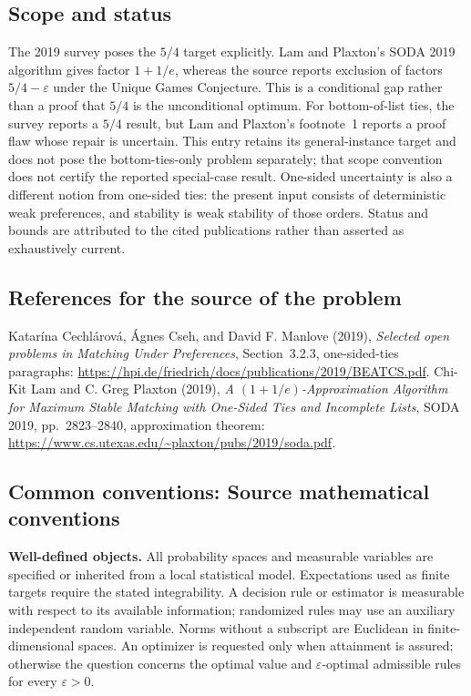 \documentclass[11pt,a4paper]{article}
\begin{document}
\subsection*{Scope and status}
The 2019 survey poses the $5/4$ target explicitly. Lam and Plaxton's SODA 2019 algorithm gives factor $1+1/e$, whereas the source reports exclusion of factors $5/4-\varepsilon$ under the Unique Games Conjecture. This is a conditional gap rather than a proof that $5/4$ is the unconditional optimum. For bottom-of-list ties, the survey reports a $5/4$ result, but Lam and Plaxton's footnote~1 reports a proof flaw whose repair is uncertain. This entry retains its general-instance target and does not pose the bottom-ties-only problem separately; that scope convention does not certify the reported special-case result. One-sided uncertainty is also a different notion from one-sided ties: the present input consists of deterministic weak preferences, and stability is weak stability of those orders. Status and bounds are attributed to the cited publications rather than asserted as exhaustively current.
\subsection*{References for the source of the problem}
Katar\'ina Cechl\'arov\'a, \'Agnes Cseh, and David F. Manlove (2019), \emph{Selected open problems in Matching Under Preferences}, Section~3.2.3, one-sided-ties paragraphs: \url{https://hpi.de/friedrich/docs/publications/2019/BEATCS.pdf}. Chi-Kit Lam and C. Greg Plaxton (2019), \emph{A $(1+1/e)$-Approximation Algorithm for Maximum Stable Matching with One-Sided Ties and Incomplete Lists}, SODA 2019, pp.~2823--2840, approximation theorem: \url{https://www.cs.utexas.edu/~plaxton/pubs/2019/soda.pdf}.

\subsection*{Common conventions: Source mathematical conventions}

\textbf{Well-defined objects.}
All probability spaces and measurable variables are specified or inherited
from a local statistical model. Expectations used as finite targets require
the stated integrability. A decision rule or estimator is measurable with
respect to its available information; randomized rules may use an auxiliary
independent random variable. Norms without a subscript are Euclidean in
finite-dimensional spaces. An optimizer is requested only when attainment
is assured; otherwise the question concerns the optimal value and
$\varepsilon$-optimal admissible rules for every $\varepsilon>0$.
\end{document}
